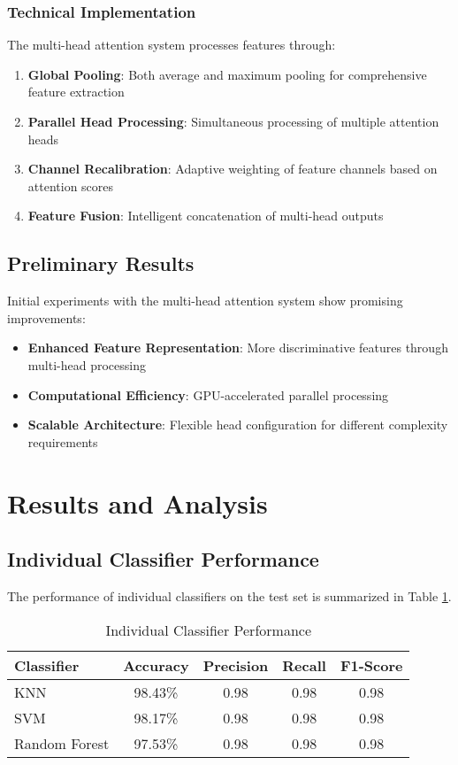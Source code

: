 \documentclass[journal]{IEEEtran}
\begin{document}
\subsubsection{Technical Implementation}

The multi-head attention system processes features through:
\begin{enumerate}
    \item \textbf{Global Pooling}: Both average and maximum pooling for comprehensive feature extraction
    \item \textbf{Parallel Head Processing}: Simultaneous processing of multiple attention heads
    \item \textbf{Channel Recalibration}: Adaptive weighting of feature channels based on attention scores
    \item \textbf{Feature Fusion}: Intelligent concatenation of multi-head outputs
\end{enumerate}

\subsection{Preliminary Results}

Initial experiments with the multi-head attention system show promising improvements:
\begin{itemize}
    \item \textbf{Enhanced Feature Representation}: More discriminative features through multi-head processing
    \item \textbf{Computational Efficiency}: GPU-accelerated parallel processing
    \item \textbf{Scalable Architecture}: Flexible head configuration for different complexity requirements
\end{itemize}

\section{Results and Analysis}

\subsection{Individual Classifier Performance}

The performance of individual classifiers on the test set is summarized in Table \ref{tab:individual_results}.

\begin{table}[!t]
\centering
\caption{Individual Classifier Performance}
\label{tab:individual_results}
\begin{tabular}{@{}lcccc@{}}
\toprule
\textbf{Classifier} & \textbf{Accuracy} & \textbf{Precision} & \textbf{Recall} & \textbf{F1-Score} \\
\midrule
KNN & 98.43\% & 0.98 & 0.98 & 0.98 \\
SVM & 98.17\% & 0.98 & 0.98 & 0.98 \\
Random Forest & 97.53\% & 0.98 & 0.98 & 0.98 \\
\bottomrule
\end{tabular}
\end{table}
\end{document}
